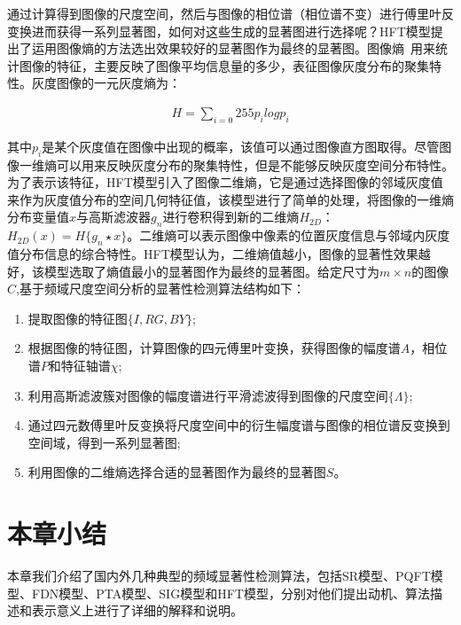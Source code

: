 通过计算得到图像的尺度空间，然后与图像的相位谱（相位谱不变）进行傅里叶反变换进而获得一系列显著图，如何对这些生成的显著图进行选择呢？HFT模型提出了运用图像熵的方法选出效果较好的显著图作为最终的显著图。图像熵~\cite{Abutaleb1989Automatic}用来统计图像的特征，主要反映了图像平均信息量的多少，表征图像灰度分布的聚集特性。灰度图像的一元灰度熵为：
\begin{linenomath}
\begin{align}
H=\sum_{i=0}{255}p_{i}log p_{i}
\label{式3_34}
\end{align}
\end{linenomath}
其中$p_{i}$是某个灰度值在图像中出现的概率，该值可以通过图像直方图取得。尽管图像一维熵可以用来反映灰度分布的聚集特性，但是不能够反映灰度空间分布特性。为了表示该特征，HFT模型引入了图像二维熵，它是通过选择图像的邻域灰度值来作为灰度值分布的空间几何特征值，该模型进行了简单的处理，将图像的一维熵分布变量值$x$与高斯滤波器$g_{n}$进行卷积得到新的二维熵$H_{2D}$：$H_{2D}(x)=H\{g_{n}\star x\}$。二维熵可以表示图像中像素的位置灰度信息与邻域内灰度值分布信息的综合特性。HFT模型认为，二维熵值越小，图像的显著性效果越好，该模型选取了熵值最小的显著图作为最终的显著图。给定尺寸为$m×n$的图像$C$,基于频域尺度空间分析的显著性检测算法结构如下：
\begin{enumerate}
\item 提取图像的特征图$\{I,RG,BY\}$;
\item 根据图像的特征图，计算图像的四元傅里叶变换，获得图像的幅度谱$A$，相位谱$P$和特征轴谱$\chi$;
\item 利用高斯滤波簇对图像的幅度谱进行平滑滤波得到图像的尺度空间$\{\Lambda\}$;
\item 通过四元数傅里叶反变换将尺度空间中的衍生幅度谱与图像的相位谱反变换到空间域，得到一系列显著图;
\item 利用图像的二维熵选择合适的显著图作为最终的显著图$S$。
\end{enumerate}

\section{本章小结}
\label{3_7}

本章我们介绍了国内外几种典型的频域显著性检测算法，包括SR模型、PQFT模型、FDN模型、PTA模型、SIG模型和HFT模型，分别对他们提出动机、算法描述和表示意义上进行了详细的解释和说明。
